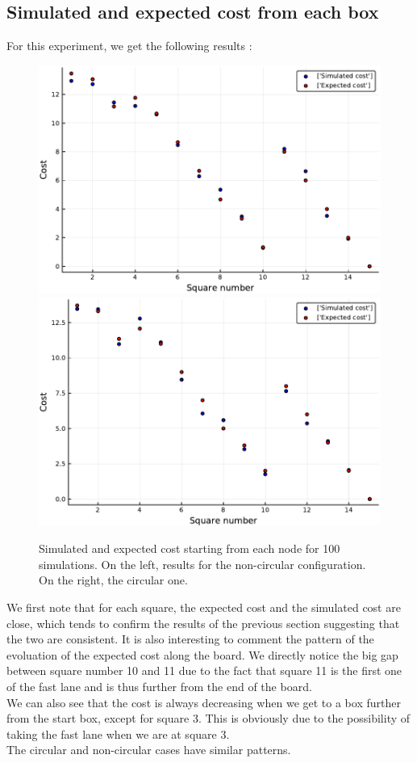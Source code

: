 \subsection{Simulated and expected cost from each box}
For this experiment, we get the following results :

\begin{figure}[H]
\centering
\includegraphics[scale=0.41]{../img/board_unif_low/cost_per_square_100_iter_noncirc.pdf}
\includegraphics[scale=0.41]{../img/board_unif_low/cost_per_square_100_iter_circ.pdf}
\caption{Simulated and expected cost starting from each node for 100 simulations. On the left, results for the non-circular configuration. On the right, the circular one.}
\label{fig:cost_per_square_100_iter}
\end{figure}

We first note that for each square, the expected cost and the simulated cost are close, which tends to confirm the results of the previous section suggesting that the two are consistent. 
It is also interesting to comment the pattern of the evoluation of the expected cost along the board. 
We directly notice the big gap between square number 10 and 11 due to the fact that square 11 is the first one of the fast lane and is thus further from the end of the board. \\
We can also see that the cost is always decreasing when we get to a box further from the start box, except for square 3. 
This is obviously due to the possibility of taking the fast lane when we are at square 3. \\
The circular and non-circular cases have similar patterns. 

